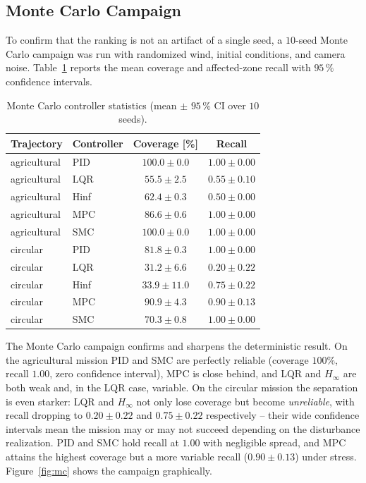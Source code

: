\documentclass[12pt,a4paper]{article}
\begin{document}
\subsection{Monte Carlo Campaign}
To confirm that the ranking is not an artifact of a single seed, a $10$-seed Monte
Carlo campaign was run with randomized wind, initial conditions, and camera noise.
Table~\ref{tab:mc} reports the mean coverage and affected-zone recall with $95\,\%$
confidence intervals.

\begin{table}[H]
    \centering
    \caption{Monte Carlo controller statistics (mean $\pm$ $95\,\%$ CI over $10$ seeds).}
    \label{tab:mc}
    \begin{tabular}{llcc}
        \toprule
        \textbf{Trajectory} & \textbf{Controller} & \textbf{Coverage [\%]} & \textbf{Recall} \\
        \midrule
        agricultural & PID  & $100.0 \pm 0.0$ & $1.00 \pm 0.00$ \\
        agricultural & LQR  & $55.5 \pm 2.5$  & $0.55 \pm 0.10$ \\
        agricultural & Hinf & $62.4 \pm 0.3$  & $0.50 \pm 0.00$ \\
        agricultural & MPC  & $86.6 \pm 0.6$  & $1.00 \pm 0.00$ \\
        agricultural & SMC  & $100.0 \pm 0.0$ & $1.00 \pm 0.00$ \\
        \midrule
        circular & PID  & $81.8 \pm 0.3$   & $1.00 \pm 0.00$ \\
        circular & LQR  & $31.2 \pm 6.6$   & $0.20 \pm 0.22$ \\
        circular & Hinf & $33.9 \pm 11.0$  & $0.75 \pm 0.22$ \\
        circular & MPC  & $90.9 \pm 4.3$   & $0.90 \pm 0.13$ \\
        circular & SMC  & $70.3 \pm 0.8$   & $1.00 \pm 0.00$ \\
        \bottomrule
    \end{tabular}
\end{table}

The Monte Carlo campaign confirms and sharpens the deterministic result. On the
agricultural mission PID and SMC are perfectly reliable (coverage $100\%$, recall
$1.00$, zero confidence interval), MPC is close behind, and LQR and $H_\infty$ are
both weak and, in the LQR case, variable. On the circular mission the separation is
even starker: LQR and $H_\infty$ not only lose coverage but become \emph{unreliable},
with recall dropping to $0.20\pm0.22$ and $0.75\pm0.22$ respectively -- their wide
confidence intervals mean the mission may or may not succeed depending on the
disturbance realization. PID and SMC hold recall at $1.00$ with negligible spread,
and MPC attains the highest coverage but a more variable recall ($0.90\pm0.13$) under
stress. Figure~\ref{fig:mc} shows the campaign graphically.
\end{document}
